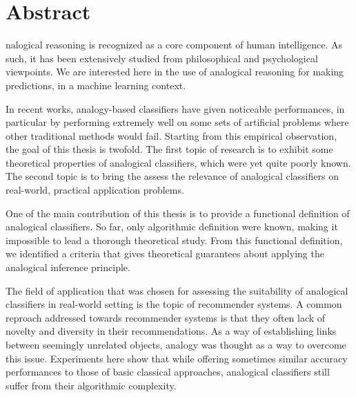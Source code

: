 \chapter*{Abstract}

nalogical reasoning is recognized as a core component of human intelligence.
As such, it has been extensively studied from philosophical and psychological
viewpoints. We are interested here in the use of analogical reasoning for
making predictions, in a machine learning context.

In recent works, analogy-based classifiers have given noticeable performances,
in particular by performing extremely well on some sets of artificial problems
where other traditional methods would fail. Starting from this empirical
observation, the goal of this thesis is twofold. The first topic of research is
to exhibit some theoretical properties of analogical classifiers, which were
yet quite poorly known. The second topic is to bring the assess the relevance
of analogical classifiers on real-world, practical application problems.

One of the main contribution of this thesis is to provide a functional
definition of analogical classifiers. So far, only algorithmic definition were
known, making it impossible to lead a thorough theoretical study. From this
functional definition, we identified a criteria that gives theoretical
guarantees about applying the analogical inference principle.

The field of application that was chosen for assessing the suitability of
analogical classifiers in real-world setting is the topic of recommender
systems. A common reproach addressed towards recommender systems is that they
often lack of novelty and diversity in their recommendations. As a way of
establishing links between seemingly unrelated objects, analogy was thought as
a way to overcome this issue. Experiments here show that while offering
sometimes similar accuracy performances to those of basic classical approaches,
analogical classifiers still suffer from their algorithmic complexity.
